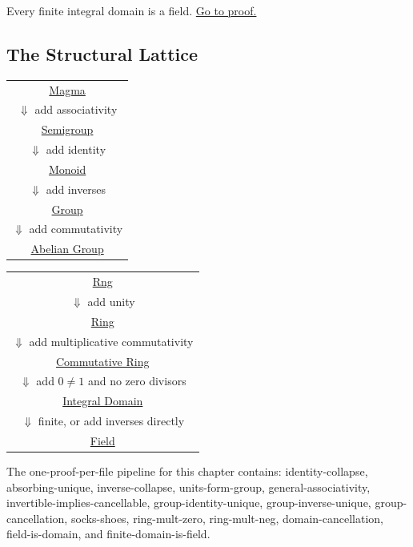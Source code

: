 \begin{proposition}
\label{prop:finite-domain-is-field}
Every finite integral domain is a field.
\hyperref[prf:finite-domain-is-field]{Go to proof.}
\end{proposition}

\subsection{The Structural Lattice}
\label{sec:structural-lattice}

\begin{center}
\small
\begin{tabular}{c}
\hyperref[def:magma]{Magma}\\
$\Downarrow$ add associativity\\
\hyperref[def:semigroup]{Semigroup}\\
$\Downarrow$ add identity\\
\hyperref[def:monoid]{Monoid}\\
$\Downarrow$ add inverses\\
\hyperref[def:group]{Group}\\
$\Downarrow$ add commutativity\\
\hyperref[def:abelian-group]{Abelian Group}
\end{tabular}
\qquad
\begin{tabular}{c}
\hyperref[def:rng]{Rng}\\
$\Downarrow$ add unity\\
\hyperref[def:ring]{Ring}\\
$\Downarrow$ add multiplicative commutativity\\
\hyperref[def:commutative-ring]{Commutative Ring}\\
$\Downarrow$ add $0\neq 1$ and no zero divisors\\
\hyperref[def:integral-domain]{Integral Domain}\\
$\Downarrow$ finite, or add inverses directly\\
\hyperref[def:field]{Field}
\end{tabular}
\end{center}

\begin{remark*}
The one-proof-per-file pipeline for this chapter contains:
identity-collapse, absorbing-unique, inverse-collapse, units-form-group,
general-associativity, invertible-implies-cancellable, group-identity-unique,
group-inverse-unique, group-cancellation, socks-shoes, ring-mult-zero,
ring-mult-neg, domain-cancellation, field-is-domain, and
finite-domain-is-field.
\end{remark*}
